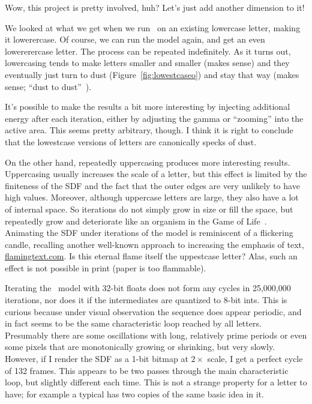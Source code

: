\documentclass[twocolumn]{article}
\begin{document}
Wow, this project is pretty involved, huh? Let's just add another
dimension to it!

We looked at what we get when we run \makelowercase\ on an existing
lowercase letter, making it lowerercase. Of course, we can run the
model again, and get an even lowererercase letter. The process can be
repeated indefinitely. As it turns out, lowercasing tends to make
letters smaller and smaller (makes sense) and they eventually just
turn to dust (Figure~\ref{fig:lowestcaseo}) and stay that way (makes
sense; ``dust to dust''~\cite{commonprayerburial}).

It's possible to make the results a bit more interesting by injecting
additional energy after each iteration, either by adjusting the gamma
or ``zooming'' into the active area. This seems pretty arbitrary,
though. I think it is right to conclude that the lowestcase versions
of letters are canonically specks of dust.

On the other hand, repeatedly uppercasing produces more interesting
results. Uppercasing usually increases the scale of a letter, but this
effect is limited by the finiteness of the SDF and the fact that the
outer edges are very unlikely to have high values. Moreover, although
uppercase letters are large, they also have a lot of internal space.
So iterations do not simply grow in size or fill the space, but
repeatedly grow and deteriorate like an organism in the Game of
Life~\cite{games1970fantastic}. Animating the SDF under iterations of
the model is reminiscent of a flickering candle, recalling another
well-known approach to increasing the emphasis of text,
\url{flamingtext.com}. Is this eternal flame itself the uppestcase
letter? Alas, such an effect is not possible in print (paper is too
flammable).

Iterating the \makeuppercase\ model with 32-bit floats does not form
any cycles in 25,000,000 iterations, nor does it if the intermediates
are quantized to 8-bit ints. This is curious because under visual
observation the sequence does appear periodic, and in fact seems to be
the same characteristic loop reached by all letters. Presumably there
are some oscillations with long, relatively prime periods or even some
pixels that are monotonically growing or shrinking, but very slowly.
However, if I render the SDF as a 1-bit bitmap at $2\times$ scale, I
get a perfect cycle of 132 frames. This appears to be two passes
through the main characteristic loop, but slightly different each
time. This is not a strange property for a letter to have; for example
a typical  has two copies of the same basic idea in it.
\end{document}
